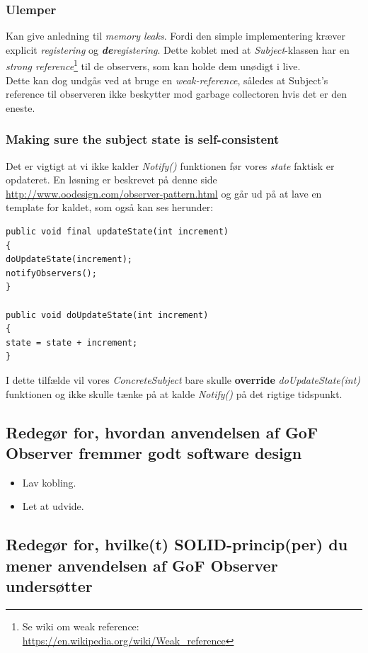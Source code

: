 \subsubsection{Ulemper}
Kan give anledning til \textit{memory leaks}. Fordi den simple implementering kræver explicit \textit{registering} og \textit{\textbf{de}registering}. Dette koblet med at \textit{Subject}-klassen har en \textit{strong reference}\footnote{Se wiki om weak reference:\\ \url{https://en.wikipedia.org/wiki/Weak_reference}} til de observers, som kan holde dem unødigt i live.\\
Dette kan dog undgås ved at bruge en \textit{weak-reference}, således at Subject's reference til observeren ikke beskytter mod garbage collectoren hvis det er den eneste.

\subsubsection{Making sure the subject state is self-consistent}
Det er vigtigt at vi ikke kalder \textit{Notify()} funktionen før vores \textit{state} faktisk er opdateret. En løsning er beskrevet på denne side \url{http://www.oodesign.com/observer-pattern.html} og går ud på at lave en template for kaldet, som også kan ses herunder:

\begin{lstlisting}
public void final updateState(int increment)
{
doUpdateState(increment);
notifyObservers();
}

public void doUpdateState(int increment)
{
state = state + increment;		
}
\end{lstlisting}

I dette tilfælde vil vores \textit{ConcreteSubject} bare skulle \textbf{override} \textit{doUpdateState(int)} funktionen og ikke skulle tænke på at kalde \textit{Notify()} på det rigtige tidspunkt.

\subsection{Redegør for, hvordan anvendelsen af GoF Observer fremmer godt software design}

\begin{itemize}
	\item Lav kobling.
	\item Let at udvide.
\end{itemize}

\subsection{Redegør for, hvilke(t) SOLID-princip(per) du mener anvendelsen af GoF Observer undersøtter}

